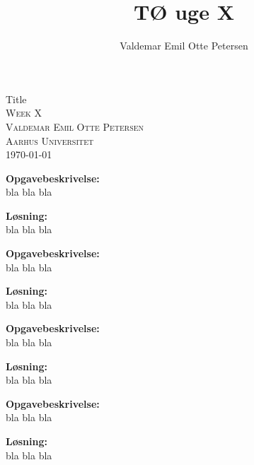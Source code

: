 \documentclass{article}
\author{Valdemar Emil Otte Petersen}
\title{TØ uge X}
\begin{document}
\begingroup

\centering 
{\LARGE Title}\\ %
\vspace*{1\baselineskip}
\scshape
Week X\\
Valdemar Emil Otte Petersen\\ %
{\small Aarhus Universitet}\\ 
{\small \today}

\endgroup

\begin{assignment}[Opgave 4.8]
  \begin{description}
    \textbf{Opgavebeskrivelse:}\\
    bla bla bla
  \end{description}
  \begin{solution}
    \textbf{Løsning:}\\
    bla bla bla
  \end{solution}
\end{assignment}


\begin{assignment}[Opgave 4.9]
  \begin{description}
    \textbf{Opgavebeskrivelse:}\\
    bla bla bla
  \end{description}
  \begin{solution}
    \textbf{Løsning:}\\
    bla bla bla
  \end{solution}
\end{assignment}


\begin{assignment}[Opgave 4.11]
  \begin{description}
    \textbf{Opgavebeskrivelse:}\\
    bla bla bla
  \end{description}
  \begin{solution}
    \textbf{Løsning:}\\
    bla bla bla
  \end{solution}
\end{assignment}


\begin{assignment}[Opgave 4.14]
  \begin{description}
    \textbf{Opgavebeskrivelse:}\\
    bla bla bla
  \end{description}
  \begin{solution}
    \textbf{Løsning:}\\
    bla bla bla
  \end{solution}
\end{assignment}
\end{document}
